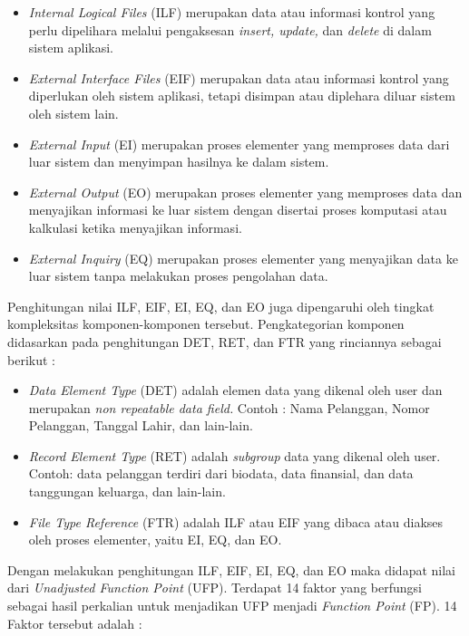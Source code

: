 \documentclass[a4paper]{article}
\begin{document}
\begin{multicols}{2}
\begin{itemize}
  \item \textit{Internal Logical Files} (ILF) merupakan data atau informasi kontrol yang perlu dipelihara melalui pengaksesan \textit{insert, update,} dan \textit{delete} di dalam sistem aplikasi.
  \item\textit{External Interface Files} (EIF) merupakan data atau informasi kontrol yang diperlukan oleh sistem aplikasi, tetapi disimpan atau diplehara diluar sistem oleh sistem lain.
  \item \textit{External Input} (EI) merupakan proses elementer yang memproses data dari luar sistem dan menyimpan hasilnya ke dalam sistem.
  \item \textit{External Output} (EO) merupakan proses elementer yang memproses data dan menyajikan informasi ke luar sistem dengan disertai proses komputasi atau kalkulasi ketika menyajikan informasi.
  \item \textit{External Inquiry} (EQ) merupakan proses elementer yang menyajikan data ke luar sistem tanpa melakukan proses pengolahan data.
\end{itemize}

\par Penghitungan nilai ILF, EIF, EI, EQ, dan EO juga dipengaruhi oleh tingkat kompleksitas komponen-komponen tersebut. Pengkategorian komponen didasarkan pada penghitungan DET, RET, dan FTR yang rinciannya sebagai berikut \citep{Pradani2013} :

\begin{itemize}
    \item \textit{Data Element Type} (DET) adalah elemen data yang dikenal oleh user dan merupakan \textit{non repeatable data field.} Contoh : Nama Pelanggan, Nomor Pelanggan, Tanggal Lahir, dan lain-lain.
    \item \textit{Record Element Type} (RET) adalah \textit{subgroup} data yang dikenal oleh user. Contoh: data pelanggan terdiri dari biodata, data finansial, dan data tanggungan keluarga, dan lain-lain.
    \item \textit{File Type Reference} (FTR) adalah ILF atau EIF yang dibaca atau diakses oleh proses elementer, yaitu EI, EQ, dan EO.
\end{itemize}

\par Dengan melakukan penghitungan ILF, EIF, EI, EQ, dan EO maka didapat nilai dari \textit{Unadjusted Function Point} (UFP). Terdapat 14 faktor yang berfungsi sebagai hasil perkalian untuk menjadikan UFP menjadi \textit{Function Point} (FP). 14 Faktor tersebut adalah \citep{Pradani2013} :


\end{multicols}
\end{document}
